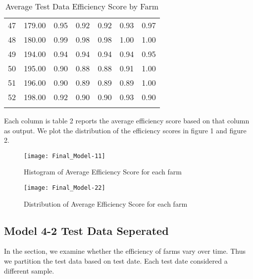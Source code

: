 \documentclass[12pt,]{article}
\begin{document}
\begin{longtable}{l|l|l|l|l|l|l}
  47 & 179.00 & 0.95 & 0.92 & 0.92 & 0.93 & 0.97 \\ 
  48 & 180.00 & 0.99 & 0.98 & 0.98 & 1.00 & 1.00 \\ 
  49 & 194.00 & 0.94 & 0.94 & 0.94 & 0.94 & 0.95 \\ 
  50 & 195.00 & 0.90 & 0.88 & 0.88 & 0.91 & 1.00 \\ 
  51 & 196.00 & 0.90 & 0.89 & 0.89 & 0.89 & 1.00 \\ 
  52 & 198.00 & 0.92 & 0.90 & 0.90 & 0.93 & 0.90 \\ 
   \hline
\hline
\caption{Average Test Data Efficiency Score by Farm} 
\label{Table-2}
\end{longtable}Each column is table 2 reports the average efficiency score based on that column as output. We plot the distribution of the efficiency scores in figure 1 and figure 2.

\begin{figure}[H]
\texttt{[image: Final\_Model-11]}
\caption{Histogram of Average Efficiency Score for each farm}
\end{figure}


\begin{figure}[H]
\texttt{[image: Final\_Model-22]}
\caption{Distribution of Average Efficiency Score for each farm}
\end{figure}

\subsection{Model 4-2 Test Data Seperated}
In the section, we examine whether the efficiency of farms vary over time.  Thus we partition the test data based on test date. Each test date considered a different sample.
\end{document}
